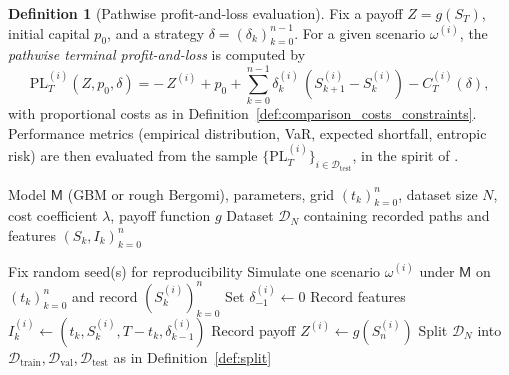 \documentclass[12pt,a4paper]{article}
\theoremstyle{definition}
\newtheorem{definition}{Definition}[section]
\theoremstyle{plain}
\theoremstyle{remark}
\theoremstyle{plain}
\begin{document}
\begin{definition}[Pathwise profit-and-loss evaluation]
\label{def:pathwise_pl_eval}
Fix a payoff $Z=g(S_T)$, initial capital $p_0$, and a strategy $\delta=(\delta_k)_{k=0}^{n-1}$. 
For a given scenario $\omega^{(i)}$, the \emph{pathwise terminal profit-and-loss} is computed by
\[
\mathrm{PL}_T^{(i)}(Z,p_0,\delta)
=
-\,Z^{(i)} + p_0 + \sum_{k=0}^{n-1}\delta_k^{(i)}\,(S_{k+1}^{(i)}-S_k^{(i)}) - C_T^{(i)}(\delta),
\]
with proportional costs as in Definition~\ref{def:comparison_costs_constraints}. 
Performance metrics (empirical distribution, VaR, expected shortfall, entropic risk) are then evaluated from the sample $\{\mathrm{PL}_T^{(i)}\}_{i\in\mathcal{D}_{\mathrm{test}}}$, in the spirit of \cite{Buehler2019DeepHedging}.
\end{definition}

\begin{algorithm}[H]
\caption{Scenario generation and dataset construction}
\label{alg:dataset_construction}
\begin{algorithmic}[1]
\Require Model $\mathsf{M}$ (GBM or rough Bergomi), parameters, grid $(t_k)_{k=0}^n$, dataset size $N$, cost coefficient $\lambda$, payoff function $g$
\Ensure Dataset $\mathcal{D}_N$ containing recorded paths and features $(S_k,I_k)_{k=0}^{n}$

\State Fix random seed(s) for reproducibility
    \State Simulate one scenario $\omega^{(i)}$ under $\mathsf{M}$ on $(t_k)_{k=0}^n$ and record $(S_k^{(i)})_{k=0}^n$
    \State Set $\delta_{-1}^{(i)}\gets 0$
        \State Record features $I_k^{(i)}\gets(t_k,S_k^{(i)},T-t_k,\delta_{k-1}^{(i)})$
    \EndFor
    \State Record payoff $Z^{(i)}\gets g(S_n^{(i)})$
\EndFor
\State Split $\mathcal{D}_N$ into $\mathcal{D}_{\mathrm{train}},\mathcal{D}_{\mathrm{val}},\mathcal{D}_{\mathrm{test}}$ as in Definition~\ref{def:split}
\end{algorithmic}
\end{algorithm}
\end{document}
